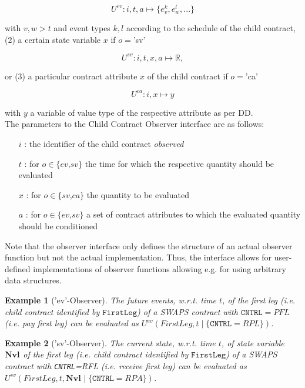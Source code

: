 \documentclass[9pt,oneside]{amsart}
\newtheorem{example}{Example}
\newcommand{\Real}{\mathbb{R}}
\newcommand{\svar}[2]{\textbf{#1}_{#2}}
\newcommand{\attr}[1]{\texttt{#1}}
\newcommand{\cldev}[3]{U^{ev}(#1,#2 \mid\{#3\})}
\newcommand{\cldsv}[4]{U^{sv}(#1,#2,\svar{#3}{} \mid\{#4\})}
\newcommand{\cldfunc}[1]{U^{#1}}
\begin{document}
\begin{multicols}{2}
\[
	\cldfunc{ev}: i,t,a \mapsto \{e_v^{k},e_w^{l},...\}
\]

with $v,w>t$ and event types $k,l$ according to the schedule of the child contract, (2) a certain state variable $x$ if $o=$'sv'

\[
	\cldfunc{sv}: i,t,x,a \mapsto \Real,
\]

or (3) a particular contract attribute $x$ of the child contract if $o=$'ca'

\[
	\cldfunc{ca}: i,x \mapsto y
\]

with $y$ a variable of value type of the respective attribute as per DD.\\

The parameters to the Child Contract Observer interface are as follows:

\begin{itemize}
	\item[$i$]: the identifier of the child contract \textit{observed}

	\item[$t$]: for $o\in\{\textit{ev,sv}\}$ the time for which the respective quantity should be evaluated

	\item [$x$]: for $o\in\{\textit{sv,ca}\}$ the quantity to be evaluated

	\item [$a$]: for $o\in\{\textit{ev,sv}\}$ a set of contract attributes to which the evaluated quantity should be conditioned
\end{itemize}


Note that the observer interface only defines the structure of an actual observer function but not the actual implementation. Thus, the interface allows for user-defined implementations of observer functions allowing e.g. for using arbitrary data structures.

\begin{example}['ev'-Observer] The future events, w.r.t. time $t$, of the \textit{first leg} (i.e. child contract identified by $\texttt{FirstLeg}$) of a SWAPS contract with $\attr{CNTRL}=PFL$ (i.e. \textit{pay first leg}) can be evaluated as $\cldev{FirstLeg}{t}{\attr{CNTRL}=RPL}$.
\end{example}

\begin{example}['sv'-Observer] The current state, w.r.t. time $t$, of state variable $\svar{Nvl}{}$ of the \textit{first leg} (i.e. child contract identified by $\texttt{FirstLeg}$) of a SWAPS contract with \attr{CNTRL}=RFL (i.e. \textit{receive first leg}) can be evaluated as $\cldsv{FirstLeg}{t}{Nvl}{\attr{CNTRL}=RPA}$.
\end{example}


\end{multicols}
\end{document}
